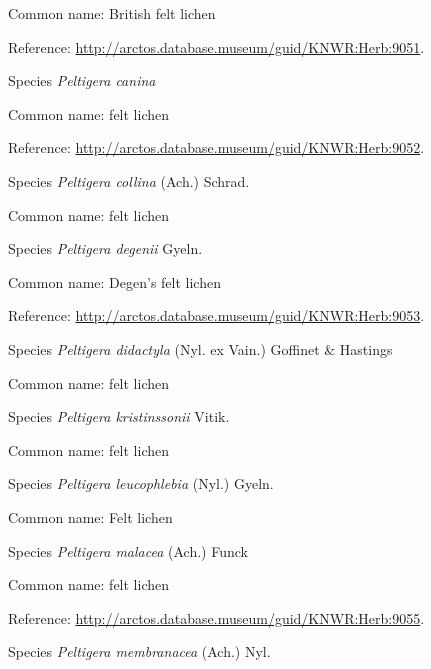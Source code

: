 \documentclass[9pt, article]{memoir}
\begin{document}
\begin{multicols}{2}
Common name: British felt lichen

Reference: 
\url{http://arctos.database.museum/guid/KNWR:Herb:9051}.

\vspace{6pt}\noindent\hspace{36pt}Species \textit{Peltigera canina}


Common name: felt lichen

Reference: 
\url{http://arctos.database.museum/guid/KNWR:Herb:9052}.

\vspace{6pt}\noindent\hspace{36pt}Species \textit{Peltigera collina} (Ach.) Schrad.


Common name: felt lichen

\vspace{6pt}\noindent\hspace{36pt}Species \textit{Peltigera degenii} Gyeln.


Common name: Degen's felt lichen

Reference: 
\url{http://arctos.database.museum/guid/KNWR:Herb:9053}.

\vspace{6pt}\noindent\hspace{36pt}Species \textit{Peltigera didactyla} (Nyl. ex Vain.) Goffinet \& Hastings


Common name: felt lichen

\vspace{6pt}\noindent\hspace{36pt}Species \textit{Peltigera kristinssonii} Vitik.


Common name: felt lichen

\vspace{6pt}\noindent\hspace{36pt}Species \textit{Peltigera leucophlebia} (Nyl.) Gyeln.


Common name: Felt lichen

\vspace{6pt}\noindent\hspace{36pt}Species \textit{Peltigera malacea} (Ach.) Funck


Common name: felt lichen

Reference: 
\url{http://arctos.database.museum/guid/KNWR:Herb:9055}.

\vspace{6pt}\noindent\hspace{36pt}Species \textit{Peltigera membranacea} (Ach.) Nyl.



\end{multicols}
\end{document}
